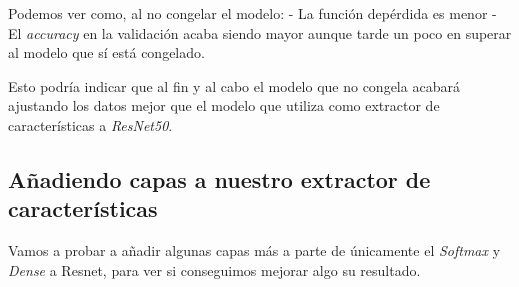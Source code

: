 \documentclass[11pt]{article}
\begin{document}
    Podemos ver como, al no congelar el modelo: - La función depérdida es
menor - El \emph{accuracy} en la validación acaba siendo mayor aunque
tarde un poco en superar al modelo que sí está congelado.

Esto podría indicar que al fin y al cabo el modelo que no congela
acabará ajustando los datos mejor que el modelo que utiliza como
extractor de características a \emph{ResNet50}.

\hypertarget{auxf1adiendo-capas-a-nuestro-extractor-de-caracteruxedsticas}{%
\subsection{Añadiendo capas a nuestro extractor de
características}\label{auxf1adiendo-capas-a-nuestro-extractor-de-caracteruxedsticas}}

Vamos a probar a añadir algunas capas más a parte de únicamente el
\emph{Softmax} y \emph{Dense} a Resnet, para ver si conseguimos mejorar
algo su resultado.
\end{document}
